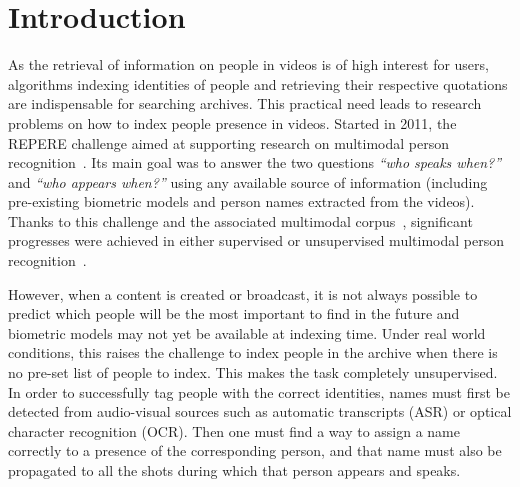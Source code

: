 \section{Introduction}

As the retrieval of information on people in videos is of high interest for users, algorithms indexing identities of people and retrieving their respective quotations are indispensable for searching archives. This practical need leads to research problems on how to index people presence in videos.
%
%
%
Started in 2011, the REPERE challenge aimed at supporting research on multimodal person recognition~\cite{BERNARD--SLAM--2013, GIRAUDEL--LREC--2012}. Its main goal was to answer the two questions \emph{``who speaks when?''} and \emph{``who appears when?''} using any available source of information (including pre-existing biometric models and person names extracted from the videos).
%
Thanks to this challenge and the associated multimodal corpus~\cite{GIRAUDEL--LREC--2012}, significant progresses were achieved in either supervised or unsupervised multimodal person recognition~\cite{BECHET--INTERSPEECH--2014, BREDIN--IJMIR--2014, GAY--CBMI--2014, poignant2012fusion, ROUVIER--CBMI--2014}.

However, when a content is created or broadcast, it is not always possible to predict which people will be the most important to find in the future and biometric models may not yet be available at indexing time.
%
Under real world conditions, this raises the challenge to index people in the archive when there is no pre-set list of people to index.
%
This makes the task completely unsupervised.
%
In order to successfully tag people with the correct identities, names must first be detected from audio-visual sources such as automatic transcripts (ASR) or optical character recognition (OCR).
%
Then one must find a way to assign a name correctly to a presence of the corresponding person, and that name must also be propagated to all the shots during which that person appears and speaks. 
%

